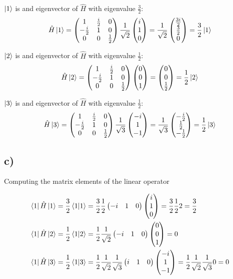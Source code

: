 \documentclass{article}
\newcommand*\colvec[3][]{
    \begin{pmatrix}\ifx\relax#1\relax\else#1\\\fi#2\\#3\end{pmatrix}
}
\begin{document}
$\ket{1}$ is and eigenvector of $\hat{H}$ with eigenvalue $\frac{3}{2}$:
\begin{equation}
\hat{H}\ket{1} = 
\begin{pmatrix}
1 & \frac{i}{2} & 0 \\
-\frac{i}{2} & 1 & 0 \\
0 & 0 & \frac{1}{2}
\end{pmatrix}
\frac{1}{\sqrt{2}}\colvec[i]{1}{0} =
\frac{1}{\sqrt{2}}\colvec[\frac{3i}{2}]{\frac{3}{2}}{0} =
\frac{3}{2}\ket{1}
\end{equation}

$\ket{2}$ is and eigenvector of $\hat{H}$ with eigenvalue $\frac{1}{2}$:
\begin{equation}
\hat{H}\ket{2} = 
\begin{pmatrix}
1 & \frac{i}{2} & 0 \\
-\frac{i}{2} & 1 & 0 \\
0 & 0 & \frac{1}{2}
\end{pmatrix}
\colvec[0]{0}{1} =
\colvec[0]{0}{\frac{1}{2}} =
\frac{1}{2}\ket{2}
\end{equation}

$\ket{3}$ is and eigenvector of $\hat{H}$ with eigenvalue $\frac{1}{2}$:
\begin{equation}
\hat{H}\ket{3} = 
\begin{pmatrix}
1 & \frac{i}{2} & 0 \\
-\frac{i}{2} & 1 & 0 \\
0 & 0 & \frac{1}{2}
\end{pmatrix}
\frac{1}{\sqrt{3}}\colvec[-i]{1}{-1} =
\frac{1}{\sqrt{3}}\colvec[-\frac{i}{2}]{\frac{1}{2}}{-\frac{1}{2}} =
\frac{1}{2}\ket{3}
\end{equation}

\subsection*{c)}

Computing the matrix elements of the linear operator

\begin{align}
\bra{1}\hat{H}\ket{1} &= \frac{3}{2}\braket{1} 
=\frac{3}{2}\frac{1}{2}\begin{pmatrix} -i & 1 &
  0 \end{pmatrix}\colvec[i]{1}{0}
=\frac{3}{2}\frac{1}{2}2=\frac{3}{2}
\\
\bra{1}\hat{H}\ket{2} &= \frac{1}{2}\braket{1}{2} 
=\frac{1}{2}\frac{1}{\sqrt{2}}\begin{pmatrix} -i & 1 &
  0 \end{pmatrix}\colvec[0]{0}{1}
=0
\\
\bra{1}\hat{H}\ket{3} &= \frac{1}{2}\braket{1}{3} 
=\frac{1}{2}\frac{1}{\sqrt{2}}\frac{1}{\sqrt{3}}\begin{pmatrix} i & 1 &
  0 \end{pmatrix}\colvec[-i]{1}{-1}
= \frac{1}{2}\frac{1}{\sqrt{2}}\frac{1}{\sqrt{3}}0=0
\end{align}
\end{document}
